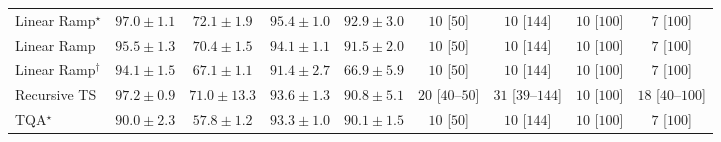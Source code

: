 \begin{tabular}{l|cccc|cccc|}
Linear Ramp$^\star$ & {\cellcolor[HTML]{712806}} \color[HTML]{F1F1F1} $97.0\pm 1.1$ & {\cellcolor[HTML]{FEB23F}} \color[HTML]{000000} $72.1\pm 1.9$ & {\cellcolor[HTML]{802D05}} \color[HTML]{F1F1F1} $95.4\pm 1.0$ & {\cellcolor[HTML]{963304}} \color[HTML]{F1F1F1} $92.9\pm 3.0$ & {\cellcolor[HTML]{FFF6F2}} \color[HTML]{000000} $10$ [$50$] & {\cellcolor[HTML]{FFF6F2}} \color[HTML]{000000} $10$ [$144$] & {\cellcolor[HTML]{FFF6F2}} \color[HTML]{000000} $10$ [$100$] & {\cellcolor[HTML]{FFF6F2}} \color[HTML]{000000} $7$ [$100$] \\
Linear Ramp & {\cellcolor[HTML]{802D05}} \color[HTML]{F1F1F1} $95.5\pm 1.3$ & {\cellcolor[HTML]{FEBE4A}} \color[HTML]{000000} $70.4\pm 1.5$ & {\cellcolor[HTML]{8B3005}} \color[HTML]{F1F1F1} $94.1\pm 1.1$ & {\cellcolor[HTML]{A33904}} \color[HTML]{F1F1F1} $91.5\pm 2.0$ & {\cellcolor[HTML]{FFF6F2}} \color[HTML]{000000} $10$ [$50$] & {\cellcolor[HTML]{FFF6F2}} \color[HTML]{000000} $10$ [$144$] & {\cellcolor[HTML]{FFF6F2}} \color[HTML]{000000} $10$ [$100$] & {\cellcolor[HTML]{FFF6F2}} \color[HTML]{000000} $7$ [$100$] \\
Linear Ramp$^\dagger$ & {\cellcolor[HTML]{8B3005}} \color[HTML]{F1F1F1} $94.1\pm 1.5$ & {\cellcolor[HTML]{FED26D}} \color[HTML]{000000} $67.1\pm 1.1$ & {\cellcolor[HTML]{A33904}} \color[HTML]{F1F1F1} $91.4\pm 2.7$ & {\cellcolor[HTML]{FED36F}} \color[HTML]{000000} $66.9\pm 5.9$ & {\cellcolor[HTML]{FFF6F2}} \color[HTML]{000000} $10$ [$50$] & {\cellcolor[HTML]{FFF6F2}} \color[HTML]{000000} $10$ [$144$] & {\cellcolor[HTML]{FFF6F2}} \color[HTML]{000000} $10$ [$100$] & {\cellcolor[HTML]{FFF6F2}} \color[HTML]{000000} $7$ [$100$] \\
Recursive TS & {\cellcolor[HTML]{702806}} \color[HTML]{F1F1F1} $97.2\pm 0.9$ & {\cellcolor[HTML]{FEBA46}} \color[HTML]{000000} $71.0\pm 13.3$ & {\cellcolor[HTML]{903104}} \color[HTML]{F1F1F1} $93.6\pm 1.3$ & {\cellcolor[HTML]{A93C03}} \color[HTML]{F1F1F1} $90.8\pm 5.1$ & {\cellcolor[HTML]{FFF3EF}} \color[HTML]{000000} $20$ [$40$--$50$] & {\cellcolor[HTML]{FEF1ED}} \color[HTML]{000000} $31$ [$39$--$144$] & {\cellcolor[HTML]{FFF6F2}} \color[HTML]{000000} $10$ [$100$] & {\cellcolor[HTML]{FFF3F0}} \color[HTML]{000000} $18$ [$40$--$100$] \\
TQA$^\star$ & {\cellcolor[HTML]{B03F03}} \color[HTML]{F1F1F1} $90.0\pm 2.3$ & {\cellcolor[HTML]{FFF7BE}} \color[HTML]{000000} $57.8\pm 1.2$ & {\cellcolor[HTML]{933204}} \color[HTML]{F1F1F1} $93.3\pm 1.0$ & {\cellcolor[HTML]{B03F03}} \color[HTML]{F1F1F1} $90.1\pm 1.5$ & {\cellcolor[HTML]{FFF6F2}} \color[HTML]{000000} $10$ [$50$] & {\cellcolor[HTML]{FFF6F2}} \color[HTML]{000000} $10$ [$144$] & {\cellcolor[HTML]{FFF6F2}} \color[HTML]{000000} $10$ [$100$] & {\cellcolor[HTML]{FFF6F2}} \color[HTML]{000000} $7$ [$100$] \\

\end{tabular}
